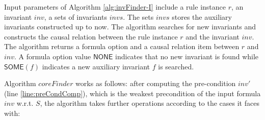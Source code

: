 \documentclass[conference]{IEEEtran}
\begin{document}
Input parameters of Algorithm \ref{alg:invFinder-I} include a rule instance $r$, an invariant $inv$, a sets of invariants $invs$.  The sets $invs$   stores the auxiliary invariants constructed up to now. The algorithm   searches for new invariants and    constructs the causal relation between the rule instance $r$ and the invariant $inv$.
The algorithm returns a formula option and a causal relation item between $r$ and $inv$. A formula option value $\mathsf{NONE}$ indicates that no new invariant is found while $\mathsf{SOME}(f)$ indicates a new auxiliary invariant $f$ is searched.


%

Algorithm $coreFinder$ works as follows: after computing the pre-condition $ inv'$ (line \ref{line:preCondComp}), which is the weakest precondition of the input formula $inv$ w.r.t. $S$, the algorithm takes further operations according to the cases it faces with:
\end{document}
